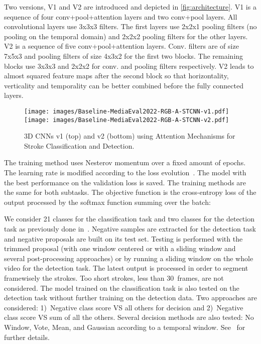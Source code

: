 \documentclass[
]{ceurart}
\begin{document}
\par
Two versions, V1 and V2 are introduced and depicted in \autoref{fig:architecture}. V1 is a sequence of four conv+pool+attention layers and two conv+pool layers. All convolutional layers use 3x3x3 filters. The first layers use 2x2x1 pooling filters (no pooling on the temporal domain) and 2x2x2 pooling filters for the other layers. V2 is a sequence of five conv+pool+attention layers. Conv. filters are of size 7x5x3 and pooling filters of size 4x3x2 for the first two blocks. The remaining blocks use 3x3x3 and 2x2x2 for conv. and pooling filters respectively. V2 leads to almost squared feature maps after the second block so that horizontality, verticality and temporality can be better combined before the fully connected layers.

\begin{figure}
    \centering
    \texttt{[image: images/Baseline-MediaEval2022-RGB-A-STCNN-v1.pdf]}\\
    \texttt{[image: images/Baseline-MediaEval2022-RGB-A-STCNN-v2.pdf]}\\
    \caption{3D CNNs v1 (top) and v2 (bottom) using Attention Mechanisms for Stroke Classification and Detection.}
  \label{fig:architecture}
\end{figure}

\par

The training method uses Nesterov momentum over a fixed amount of epochs. The learning rate is modified according to the loss evolution~\cite{PeICPR:2020}. The model with the best performance on the validation loss is saved. The training methods are the same for both subtasks. The objective function is the cross-entropy loss of the output processed by the softmax function summing over the batch:


\par
We consider 21 classes for the classification task and two classes for the detection task as previously done in~\cite{mediaeval/Martin21/baseline}. Negative samples are extracted for the detection task and negative proposals are built on its test set. Testing is performed with the trimmed proposal (with one window centered or with a sliding window and several post-processing approaches) or by running a sliding window on the whole video for the detection task. The latest output is processed in order to segment framewisely the strokes. Too short strokes, less than 30~frames, are not considered. The model trained on the classification task is also tested on the detection task without further training on the detection data. Two approaches are considered: 1)~Negative class score VS all others for decision and 2)~Negative class score VS sum of all the others. Several decision methods are also tested: No Window, Vote, Mean, and Gaussian according to a temporal window. See~\cite{PeThesis2020} for further details.
\end{document}
